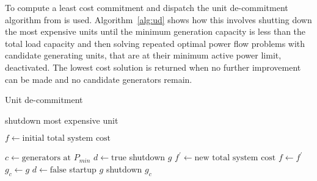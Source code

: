 To compute a least cost commitment and dispatch the unit de-commitment
algorithm from  is used.  Algorithm~\ref{alg:ud}
shows how this involves shutting down the most expensive units until the
minimum generation capacity is less than the total load capacity and then
solving repeated optimal power flow problems with candidate generating units,
that are at their minimum active power limit, deactivated.  The lowest cost
solution is returned when no further improvement can be made and no candidate
generators remain.

\begin{algorithm}%
\caption{Unit de-commitment}
\label{alg:ud}
\begin{algorithmic}[1]
	\STATE shutdown most expensive unit
\ENDWHILE

\STATE $f \leftarrow \text{initial total system cost}$

\REPEAT
	\STATE $c \leftarrow \text{generators at } P_{min}$
		\STATE $d \leftarrow \text{true}$
		\STATE shutdown $g$
		\STATE $f^\prime \leftarrow \text{new total system cost}$
			\STATE $f \leftarrow f^\prime$
			\STATE $g_{c} \leftarrow g$
			\STATE $d \leftarrow \text{false}$
		\ENDIF
		\STATE startup $g$
	\ENDFOR
	\STATE shutdown $g_c$
\end{algorithmic}
\end{algorithm}


